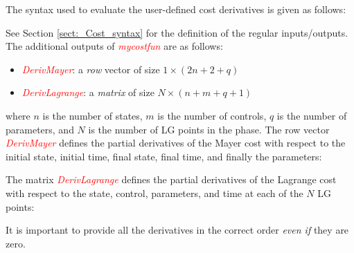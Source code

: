 \documentclass[10pt,final]{report}
\newcommand{\slred}[1]{\textcolor{red}{\sl #1}}
\begin{document}
The syntax used to evaluate the user-defined cost derivatives is given as follows:
\begin{center}
\end{center}
See Section \ref{sect:_Cost_syntax} for the definition of the regular inputs/outputs.
The additional outputs of \slred{mycostfun} are as follows:
\begin{itemize}
  \item \slred{DerivMayer}: a {\em row} vector of size $1\times (2n+2+q)$
  \item \slred{DerivLagrange}: a {\em matrix} of size $N\times (n+m+q+1)$
\end{itemize}
where $n$ is the number of states, $m$ is the number of controls, $q$ is the number of parameters, and $N$ is the number of LG points in the phase. The row vector \slred{DerivMayer} defines the partial derivatives of the Mayer cost with respect to the initial state, initial time, final state, final time, and finally the parameters:
\begin{center}
\end{center}
The matrix \slred{DerivLagrange} defines the partial derivatives of the Lagrange cost with respect to the state, control, parameters, and time at each of the $N$ LG points:
\begin{center}
\end{center}
It is important to provide all the derivatives in the correct order {\em even if} they are zero.
\end{document}
